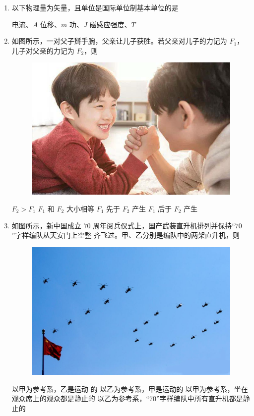 \gaokaoxz




\begin{enumerate}
\item
以下物理量为矢量，且单位是国际单位制基本单位的是  


\fourchoices
{电流、$ A $}
{位移、$ m $}
{功、$ J $}
{磁感应强度、$ T $}

\item
如图所示，一对父子掰手腕，父亲让儿子获胜。若父亲对儿子的力记为 $ F_{1} $，儿子对父亲的力记为 $ F_{2} $，则  
\begin{figure}[h!]
\centering
\includegraphics[width=0.23\linewidth]{picture/screenshot083}
\end{figure}


\fourchoices
{$ F_{2} > F_{1} $}
{$ F_{1} $ 和 $ F_{2} $ 大小相等}
{$ F_{1} $ 先于 $ F_{2} $ 产生}
{$ F_{1} $ 后于 $ F_{2} $ 产生}


\item
如图所示，新中国成立 $ 70 $ 周年阅兵仪式上，国产武装直升机排列并保持“$ 70 $”字样编队从天安门上空整
齐飞过。甲、乙分别是编队中的两架直升机，则  
\begin{figure}[h!]
\centering
\includegraphics[width=0.23\linewidth]{picture/screenshot084}
\end{figure}


\fourchoices
{以甲为参考系，乙是运动 的}
{以乙为参考系，甲是运动的}
{以甲为参考系，坐在观众席上的观众都是静止的}
{以乙为参考系，“$ 70 $”字样编队中所有直升机都是静止的}



\end{enumerate}
